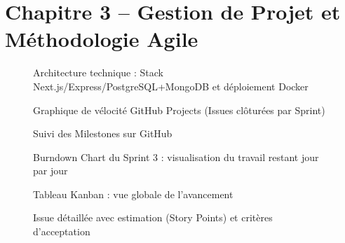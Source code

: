 \section{Chapitre 3 -- Gestion de Projet et Méthodologie Agile}

\begin{figure}[H]
    \centering
    \caption{Architecture technique : Stack Next.js/Express/PostgreSQL+MongoDB et déploiement Docker}
    \label{fig:architecture_tech-ann}
\end{figure}

\begin{figure}[H]
    \centering
    \caption{Graphique de vélocité GitHub Projects (Issues clôturées par Sprint)}
    \label{fig:velocity-ann}
\end{figure}

\begin{figure}[H]
    \centering
    \caption{Suivi des Milestones sur GitHub}
    \label{fig:milestones-ann}
\end{figure}

\begin{figure}[H]
    \centering
    \caption{Burndown Chart du Sprint 3 : visualisation du travail restant jour par jour}
    \label{fig:burndown-ann}
\end{figure}

\begin{figure}[H]
    \centering
    \caption{Tableau Kanban : vue globale de l'avancement}
    \label{fig:kanban-ann}
\end{figure}

\begin{figure}[H]
    \centering
    \caption{Issue détaillée avec estimation (Story Points) et critères d'acceptation}
    \label{fig:issue-ann}
\end{figure}

